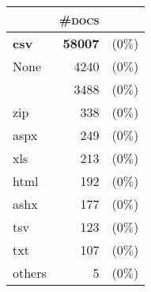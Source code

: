 \begin{tabular}{lrr} 
 \toprule 
 & \textsc{\#docs} & \\ 
 \midrule 
\textbf{csv}&\textbf{58007 }&(0$\%$)\\ 
  None&4240 &(0$\%$)\\ 
  &3488 &(0$\%$)\\ 
  zip&338 &(0$\%$)\\ 
  aspx&249 &(0$\%$)\\ 
  xls&213 &(0$\%$)\\ 
  html&192 &(0$\%$)\\ 
  ashx&177 &(0$\%$)\\ 
  tsv&123 &(0$\%$)\\ 
  txt&107 &(0$\%$)\\ 
  \bottomrule 
others&5 &(0$\%$)\\ 
  \bottomrule 
 \end{tabular}